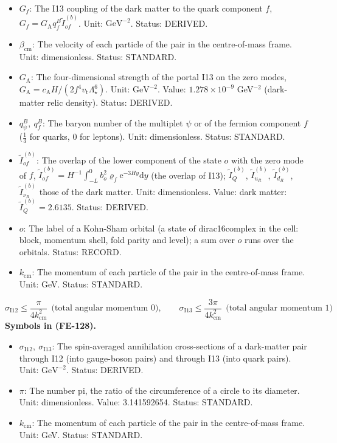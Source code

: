 \documentclass[
  10pt,
]{article}
\providecommand{\tightlist}{%
  \setlength{\itemsep}{0pt}\setlength{\parskip}{0pt}}
\begin{document}
\begin{itemize}
  doublet, 1 for a charged-lepton singlet. Unit: dimensionless. Status:
  STANDARD.
\item
  \(G_f\): The I13 coupling of the dark matter to the quark component
  \(f\), \(G_f = G_{\mathrm{A}}q^B_f\tilde I^{(b)}_{of}\). Unit:
  \(\mathrm{GeV}^{-2}\). Status: DERIVED.
\item
  \(\beta_{\mathrm{cm}}\): The velocity of each particle of the pair in
  the centre-of-mass frame. Unit: dimensionless. Status: STANDARD.
\item
  \(G_{\mathrm{A}}\): The four-dimensional strength of the portal I13 on
  the zero modes,
  \(G_{\mathrm{A}} = c_{\mathrm{A}}H/(2f^4v_{\mathrm{t}}\Lambda_\star^6)\).
  Unit: \(\mathrm{GeV}^{-2}\). Value: \(1.278\times10^{-9}\)
  GeV\(^{-2}\) (dark-matter relic density). Status: DERIVED.
\item
  \(q^B_\psi,\ q^B_f\): The baryon number of the multiplet \(\psi\) or
  of the fermion component \(f\) (\(\frac13\) for quarks, 0 for
  leptons). Unit: dimensionless. Status: STANDARD.
\item
  \(\tilde I^{(b)}_{of}\): The overlap of the lower component of the
  state \(o\) with the zero mode of \(f\),
  \(\tilde I^{(b)}_{of} = H^{-1}\int_{-L}^{0}b_o^2\varrho_f\mathrm{e}^{-3Hy}\mathrm{d}y\)
  (the overlap of I13); \(\tilde I^{(b)}_Q\), \(\tilde I^{(b)}_{u_R}\),
  \(\tilde I^{(b)}_{d_R}\), \(\tilde I^{(b)}_{\nu_R}\) those of the dark
  matter. Unit: dimensionless. Value: dark matter:
  \(\tilde I^{(b)}_Q = 2.6135\). Status: DERIVED.
\item
  \(o\): The label of a Kohn-Sham orbital (a state of dirac16complex in
  the cell: block, momentum shell, fold parity and level); a sum over
  \(o\) runs over the orbitals. Status: RECORD.
\item
  \(k_{\mathrm{cm}}\): The momentum of each particle of the pair in the
  centre-of-mass frame. Unit: GeV. Status: STANDARD.
\end{itemize}

\[
\sigma_{\mathrm{I12}} \le \frac{\pi}{4k_{\mathrm{cm}}^2}\ \ \text{(total angular momentum 0)},\qquad
\sigma_{\mathrm{I13}} \le \frac{3\pi}{4k_{\mathrm{cm}}^2}\ \ \text{(total angular momentum 1)} \tag{FE-128}
\] \textbf{Symbols in (FE-128).}

\begin{itemize}
\tightlist
\item
  \(\sigma_{\mathrm{I12}},\ \sigma_{\mathrm{I13}}\): The spin-averaged
  annihilation cross-sections of a dark-matter pair through I12 (into
  gauge-boson pairs) and through I13 (into quark pairs). Unit:
  \(\mathrm{GeV}^{-2}\). Status: DERIVED.
\item
  \(\pi\): The number pi, the ratio of the circumference of a circle to
  its diameter. Unit: dimensionless. Value: 3.141592654. Status:
  STANDARD.
\item
  \(k_{\mathrm{cm}}\): The momentum of each particle of the pair in the
  centre-of-mass frame. Unit: GeV. Status: STANDARD.
\end{itemize}
\end{document}
